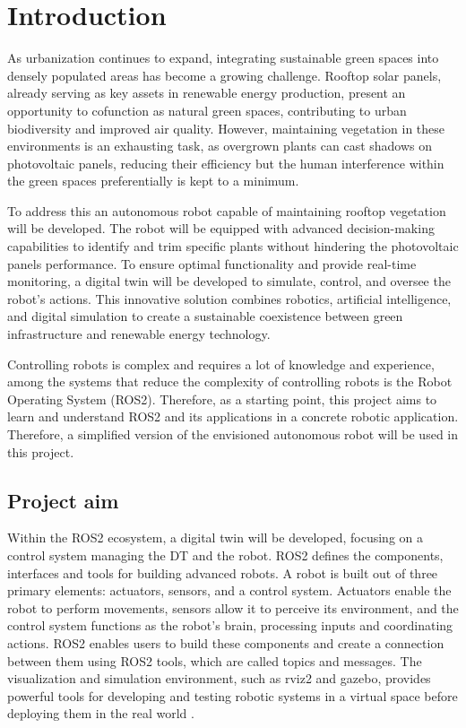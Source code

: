 \chapter{Introduction}

As urbanization continues to expand, integrating sustainable green spaces into densely populated areas has become a growing challenge. Rooftop solar panels, already serving as key assets in renewable energy production, present an opportunity to co\-function as natural green spaces, contributing to urban biodiversity and improved air quality. 
However, maintaining vegetation in these environments is an exhausting task, as overgrown plants can cast shadows on photovoltaic panels, reducing their efficiency but the human interference within the green spaces preferentially is kept to a minimum. 

To address this an autonomous robot capable of maintaining rooftop vegetation will be developed. The robot will be equipped with advanced decision-making capabilities to identify and trim specific plants without hindering the photovoltaic panels performance. To ensure optimal functionality and provide real-time monitoring, a digital twin will be developed to simulate, control, and oversee the robot's actions. This innovative solution combines robotics, artificial intelligence, and digital simulation to create a sustainable coexistence between green infrastructure and renewable energy technology. 

Controlling robots is complex and requires a lot of knowledge and experience, among the systems that reduce the complexity of controlling robots is the Robot Operating System (ROS2). 
Therefore, as a starting point, this project aims to learn and understand ROS2 and its applications in a concrete robotic application. Therefore, a simplified version of the envisioned autonomous robot will be used in this project.

\section{Project aim}

Within the ROS2 ecosystem, a digital twin will be developed, focusing on a control system managing the DT and the robot.
 ROS2 defines the components, interfaces and tools for building advanced robots. A robot is built out of three primary elements: actuators, sensors, and a control system. Actuators enable the robot to perform movements, sensors allow it to perceive its environment, and the control system functions as the robot's brain, processing inputs and coordinating actions.
ROS2 enables users to build these components and create a connection between them using ROS2 tools, which are called topics and messages. The visualization and simulation environment, such as rviz2 and gazebo, provides powerful tools for developing and testing robotic systems in a virtual space before deploying them in the real world \autocite{openroboticsROSHome}.



